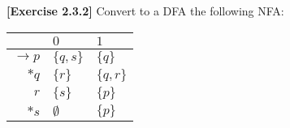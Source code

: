 \textbf{[Exercise 2.3.2]} Convert to a DFA the following NFA:
\begin{center}
    \begin{tabular}{r||l|l}
        & $0$           & $1$\\ \hline \hline
        $\rightarrow p$ & $\{q,s\}$     & $\{q\}$\\
        $*q$            & $\{r\}$       & $\{q,r\}$\\
        $r$             & $\{s\}$       & $\{p\}$\\
        $*s$            & $\emptyset$   & $\{p\}$
    \end{tabular}
\end{center}